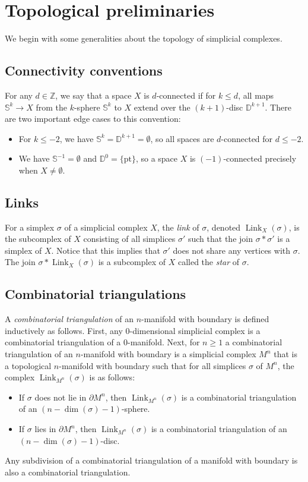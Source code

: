 \documentclass[11pt]{amsart}
\numberwithin{equation}{section}
\theoremstyle{plain}
\theoremstyle{definition}
\theoremstyle{remark}
\newcommand\Z{\ensuremath{\mathbb{Z}}}
\newcommand\bbD{\ensuremath{\mathbb{D}}}
\newcommand\bbS{\ensuremath{\mathbb{S}}}
\DeclareMathOperator{\Link}{Link}
\begin{document}
\section{Topological preliminaries}
\label{section:prelim}

We begin with some generalities about the topology of simplicial complexes.

\subsection{Connectivity conventions}
\label{section:connectivityconventions}
For any $d \in \Z$, we say that a space $X$ is $d$-connected if for $k \leq d$, all maps $\bbS^{k} \rightarrow X$
from the $k$-sphere $\bbS^{k}$ to $X$ extend over the $(k+1)$-disc $\bbD^{k+1}$.  There are two important
edge cases to this convention:
\begin{itemize}
\item For $k \leq -2$, we have $\bbS^k = \bbD^{k+1} = \emptyset$, so all spaces are $d$-connected for $d \leq -2$.
\item We have $\bbS^{-1} = \emptyset$ and $\bbD^0 = \{\text{pt}\}$, so a space $X$ is $(-1)$-connected precisely
when $X \neq \emptyset$.
\end{itemize}

\subsection{Links}
For a simplex $\sigma$ of a simplicial complex $X$, the {\em link} of $\sigma$, denoted $\Link_X(\sigma)$, is
the subcomplex of $X$ consisting of all simplices $\sigma'$ such that the join $\sigma \ast \sigma'$
is a simplex of $X$.  Notice that this implies that $\sigma'$ does not share any vertices with $\sigma$.
The join $\sigma \ast \Link_X(\sigma)$ is a subcomplex of $X$ called the {\em star} of $\sigma$.

\subsection{Combinatorial triangulations}
A {\em combinatorial triangulation} of an $n$-manifold with boundary
is defined inductively as follows.  First, 
any $0$-dimensional simplicial complex is a combinatorial triangulation of a $0$-manifold. 
 Next, for $n \geq 1$ a combinatorial triangulation of an $n$-manifold with boundary 
is a simplicial complex $M^n$ that is a topological $n$-manifold with boundary such that for all
simplices $\sigma$ of $M^n$, the complex $\Link_{M^n}(\sigma)$ is as follows:
\begin{itemize}
\item If $\sigma$ does not lie in $\partial M^n$, then $\Link_{M^n}(\sigma)$ is a combinatorial
triangulation of an $(n-\dim(\sigma)-1)$-sphere.
\item If $\sigma$ lies in $\partial M^n$, then $\Link_{M^n}(\sigma)$ is a combinatorial
triangulation of an $(n-\dim(\sigma)-1)$-disc.
\end{itemize}
Any subdivision of a combinatorial triangulation of a manifold with boundary
is also a combinatorial triangulation.
\end{document}
